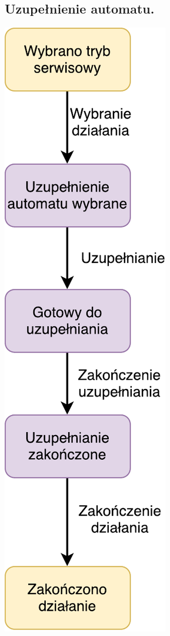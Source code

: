 \documentclass[11pt]{article}
\begin{document}
		\subsection{Uzupełnienie automatu.}
		\begin{center}
			\includegraphics[scale=1.0]{stanu5.pdf}
		\end{center}
\end{document}

